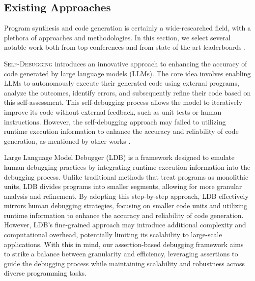 
\subsection{Existing Approaches}


Program synthesis and code generation is certainly a wide-researched field, with a plethora of approaches and methodologies. In this section, we select several notable work both from top conferences and from state-of-the-art leaderboards \cite{PaperWithCode}.

\textsc{Self-Debugging} \cite{TeachSelfDebug} introduces an innovative approach to enhancing the accuracy of code generated by large language models (LLMs). The core idea involves enabling LLMs to autonomously execute their generated code using external programs, analyze the outcomes, identify errors, and subsequently refine their code based on this self-assessment. This self-debugging process allows the model to iteratively improve its code without external feedback, such as unit tests or human instructions. However, the self-debugging approach may failed to utilizing runtime execution information to enhance the accuracy and reliability of code generation, as mentioned by other works \cite{LDB}.

Large Language Model Debugger (LDB) \cite{LDB} is a framework designed to emulate human debugging practices by integrating runtime execution information into the debugging process. Unlike traditional methods that treat programs as monolithic units, LDB divides programs into smaller segments, allowing for more granular analysis and refinement. By adopting this step-by-step approach, LDB effectively mirrors human debugging strategies, focusing on smaller code units and utilizing runtime information to enhance the accuracy and reliability of code generation. However, LDB's fine-grained approach may introduce additional complexity and computational overhead, potentially limiting its scalability to large-scale applications. With this in mind, our assertion-based debugging framework aims to strike a balance between granularity and efficiency, leveraging assertions to guide the debugging process while maintaining scalability and robustness across diverse programming tasks.

